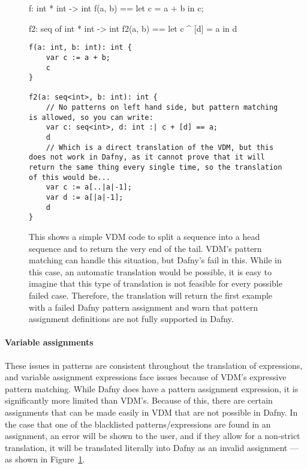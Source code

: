 \documentclass{entcs}
\begin{document}
\begin{figure}[h]
	\begin{center}
        \begin{vdmsl}
f: int * int -> int
f(a, b) == 
    let c = a + b in c;

f2: seq of int * int -> int 
f2(a, b) == 
    let c ^ [d] = a in d
        \end{vdmsl}
        \begin{lstlisting}
f(a: int, b: int): int {
    var c := a + b;
    c
}

f2(a: seq<int>, b: int): int {
    // No patterns on left hand side, but pattern matching is allowed, so you can write:
    var c: seq<int>, d: int :| c + [d] == a;
    d
    // Which is a direct translation of the VDM, but this does not work in Dafny, as it cannot prove that it will return the same thing every single time, so the translation of this would be...
    var c := a[..|a|-1];
    var d := a[|a|-1];
    d
}
        \end{lstlisting}
		\caption{This shows a simple VDM code to split a sequence into a head sequence and to return the very end of the tail. VDM's pattern matching can handle this situation, but Dafny's fail in this. While in this case, an automatic translation would be possible, it is easy to imagine that this type of translation is not feasible for every possible failed case. Therefore, the translation will return the first example with a failed Dafny pattern assignment and warn that pattern assignment definitions are not fully supported in Dafny.}\label{fig:vdm_pattern_assignment}
	\end{center}
\end{figure}

\paragraph{Variable assignments}\label{section:variable_assignment_problems}

These issues in patterns are consistent throughout the translation of expressions, and variable assignment expressions face issues because of VDM's expressive pattern matching. While Dafny does have a pattern assignment expression, it is significantly more limited than VDM's. Because of this, there are certain assignments that can be made easily in VDM that are not possible in Dafny. In the case that one of the blacklisted patterns/expressions are found in an assignment, an error will be shown to the user, and if they allow for a non-strict translation, it will be translated literally into Dafny as an invalid assignment --- as shown in Figure~\ref{fig:vdm_pattern_assignment}. 
\end{document}
